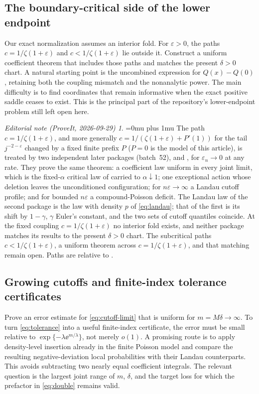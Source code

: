 \documentclass[11pt,a4paper]{article}
\numberwithin{equation}{section}
\theoremstyle{definition}
\theoremstyle{remark}
\newtheorem*{ednoteinner}{Editorial note (ProveIt, 2026-09-29)}
\newenvironment{ednote}{\begin{ednoteinner}\sloppy\Urlmuskip=0mu plus 1mu\relax}{\end{ednoteinner}}
\newcommand{\ep}{\varepsilon}\newcommand{\la}{\lambda}
\begin{document}
\subsection{The boundary-critical side of the lower endpoint}
Our exact normalization assumes an interior fold. For \(\ep>0\), the
paths \(c=1/\zeta(1+\ep)\) and \(c<1/\zeta(1+\ep)\) lie outside it.
Construct a uniform coefficient theorem that includes those paths and
matches the present \(\delta>0\) chart. A natural starting point is the
uncombined expression for \(Q(x)-Q(0)\), retaining both the coupling
mismatch and the nonanalytic power. The main difficulty is to find
coordinates that remain informative when the exact positive saddle
ceases to exist. This is the principal part of the repository's
lower-endpoint problem still left open here.
\begin{ednote}
The path \(c=1/\zeta(1+\ep)\), and more generally
\(c=1/(\zeta(1+\ep)+P'(1))\) for the tail \(j^{-2-\ep}\) changed by a fixed
finite prefix \(P\) (\(P=0\) is the model of this article), is treated by
two independent later packages (batch~52),
and
,
for \(\ep_n\to0\) at any rate. They prove the same theorem: a coefficient
law uniform in every joint limit, which is the fixed-\(\alpha\) critical law
of \cite{repo-critical} carried to \(\alpha\downarrow1\); one exceptional
action whose deletion leaves the unconditioned configuration; for
\(n\ep\to\infty\) a Landau cutoff profile; and for bounded \(n\ep\) a
compound-Poisson deficit. The Landau law of the second package is the law
with density \(p\) of \eqref{eq:landau}; that of the first is its shift by
\(1-\gamma\), \(\gamma\) Euler's constant, and the two sets of cutoff
quantiles coincide. At the fixed coupling \(c=1/\zeta(1+\ep)\) no interior
fold exists, and neither package matches its results to the present
\(\delta>0\) chart. The subcritical paths \(c<1/\zeta(1+\ep)\), a uniform
theorem across \(c=1/\zeta(1+\ep)\), and that matching remain open. Paths are
relative to .
\end{ednote}

\subsection{Growing cutoffs and finite-index tolerance certificates}
Prove an error estimate for \eqref{eq:cutoff-limit} that is uniform for
\(m=M\delta\to\infty\). To turn \eqref{eq:tolerance} into a useful
finite-index certificate, the error must be small relative to
\(\exp\{-\la\ee^{m/\la}\}\), not merely \(o(1)\).
A promising route is to apply density-level insertion already in the
finite Poisson model and compare the resulting negative-deviation
local probabilities with their Landau counterparts. This avoids
subtracting two nearly equal coefficient integrals. The relevant
question is the largest joint range of \(m\), \(\delta\), and the target
loss for which the prefactor in \eqref{eq:double} remains valid.
\end{document}
